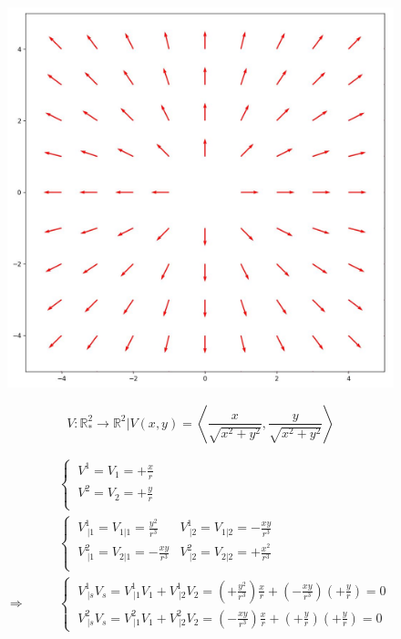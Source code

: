 \begin{figure}[H]
\centering
\begin{minipage}[H]{.4\textwidth}
\vspace{0pt}
\includegraphics[scale=.3]{unitvectorfield2.jpg}
\end{minipage}\hfill
\begin{minipage}[H]{0.4\textwidth}
\vspace{50pt}
$$V:\mathbb{R}_*^2\rightarrow \mathbb{R}^2|V(x,y) = \left< \frac{x}{\sqrt{x^2+y^2}},\frac{y}{\sqrt{x^2+y^2}} \right>$$
\end{minipage}
\end{figure}
\begin{align}
\ & \left \{ \begin{array}{c}
\ V^1 = V_1 = +\frac{x}{r}\\
\ V^2 = V_2 = +\frac{y}{r}\\
\end{array}\right.\\
\ & \left \{ \begin{array}{cc}
\ V^1_{\ |1} =  V_{1|1} = \frac{y^2}{r^3}&V^1_{\ |2} =  V_{1|2} = -\frac{xy}{r^3}\\
\ V^2_{\ |1} =  V_{2|1} = -\frac{xy}{r^3}&V^2_{\ |2} =  V_{2|2} = +\frac{x^2}{r^3}\\
\end{array}\right.\\
\Rightarrow \quad\quad &\left \{ \begin{array}{c} \  V^1_{\ |s}V_s = V^1_{\ |1}V_1+V^1_{\ |2}V_2 = (+\frac{y^2}{r^3})\frac{x}{r}+ (-\frac{xy}{r^3})(+\frac{y}{r}) =  0\\
\ V^2_{\ |s}V_s = V^2_{\ |1}V_1+V^2_{\ |2}V_2 = (-\frac{xy}{r^3})\frac{x}{r}+ (+\frac{y}{r})(+\frac{y}{r}) =  0
\end{array} \right.
\end{align}
